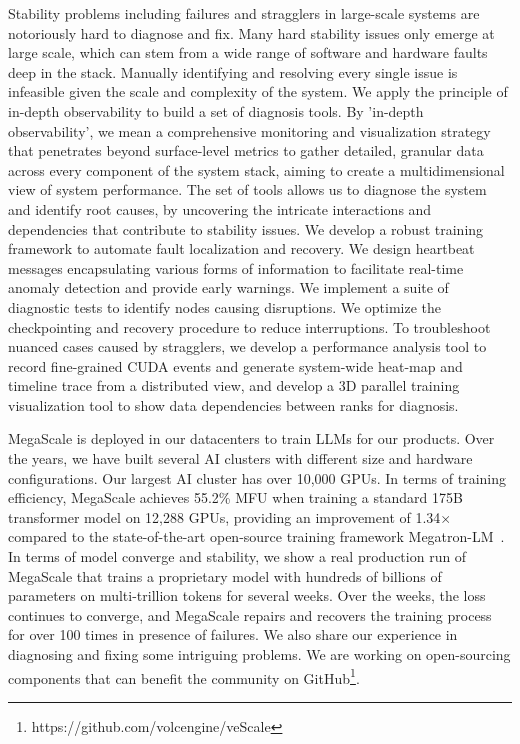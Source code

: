 \documentclass[letterpaper,twocolumn,10pt]{article}
\newcommand{\sysname}{MegaScale\xspace}
\newcommand{\revision}[1]{{#1}}
\begin{document}
Stability problems including failures and stragglers in large-scale systems are
notoriously hard to diagnose and fix. Many hard stability issues only emerge at
large scale, which can stem from a wide range of software and hardware faults
deep in the stack. Manually identifying and resolving every single issue is infeasible
given the scale and complexity of the system. \revision{We apply the principle of in-depth observability to build a set of diagnosis tools. By 'in-depth observability', we mean a comprehensive monitoring and visualization strategy that penetrates beyond surface-level metrics to gather detailed, granular data across every component of the system stack, aiming to create a multidimensional view of system performance. The set of tools allows us to diagnose the system and identify root causes, by uncovering the intricate interactions and dependencies that contribute to stability issues.} We develop a robust training framework to automate fault
localization and recovery. We design heartbeat messages encapsulating various
forms of information to facilitate real-time anomaly detection and provide
early warnings. We implement a suite of diagnostic tests to identify nodes
causing disruptions. We optimize the checkpointing and recovery procedure to
reduce interruptions. To troubleshoot nuanced cases caused by stragglers, we develop a performance analysis tool to record fine-grained
CUDA events and generate system-wide heat-map and timeline trace from a distributed view, and develop a 3D parallel
training visualization tool to show data dependencies between ranks for diagnosis.

\sysname is deployed in our datacenters to train LLMs for our products. Over the
years, we have built several AI clusters with different size and hardware
configurations. Our largest AI cluster has over 10,000 GPUs. In terms of
training efficiency, \sysname achieves 55.2\% MFU when training a standard 175B
transformer model on 12,288 GPUs, providing an improvement of 1.34$\times$
compared to the state-of-the-art open-source training framework
Megatron-LM~\cite{shoeybi2020megatronlm}. In terms of model converge and
stability,
we show a real production run of \sysname that trains a proprietary
model with hundreds of billions of parameters on multi-trillion tokens for
several weeks. Over the weeks, the loss continues to converge, and \sysname
repairs and recovers the training process for over 100 times in presence of failures.
We also share our experience in diagnosing and fixing some intriguing problems. 
\revision{We are working on open-sourcing components that can benefit the community on GitHub\footnote{https://github.com/volcengine/veScale}.}
\end{document}
